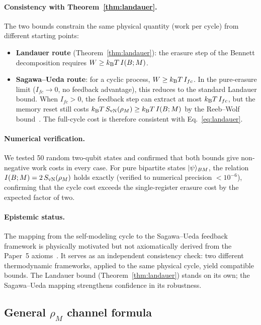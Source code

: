 \paragraph{Consistency with Theorem~\ref{thm:landauer}.}
The two bounds constrain the same physical quantity (work per cycle)
from different starting points:
\begin{itemize}
  \item \textbf{Landauer route}
    (Theorem~\ref{thm:landauer}): the erasure step of the Bennett
    decomposition requires $W \geq k_{\mathrm{B}} T\,I(B;M)$.
  \item \textbf{Sagawa--Ueda route}: for a cyclic process,
    $W \geq k_{\mathrm{B}} T\,I_{fc}$.  In the pure-erasure limit
    ($I_{fc} \to 0$, no feedback advantage), this reduces to the
    standard Landauer bound.  When $I_{fc} > 0$, the feedback
    step can extract at most $k_{\mathrm{B}} T\,I_{fc}$, but the memory reset
    still costs $k_{\mathrm{B}} T\,S_{\mathrm{vN}}(\rho_M) \geq k_{\mathrm{B}} T\,I(B;M)$ by the
    Reeb--Wolf bound~\cite{ReebWolf2014}.  The full-cycle cost
    is therefore consistent with Eq.~\eqref{eq:landauer}.
\end{itemize}

\paragraph{Numerical verification.}
We tested 50 random two-qubit states and confirmed that both bounds
give non-negative work costs in every case.  For pure bipartite states
$| \psi \rangle_{BM}$, the relation $I(B;M) = 2\,S_{\mathrm{vN}}(\rho_M)$ holds
exactly (verified to numerical precision $< 10^{-6}$), confirming that
the cycle cost exceeds the single-register erasure cost by the
expected factor of two.

\paragraph{Epistemic status.}
The mapping from the self-modeling cycle to the Sagawa--Ueda feedback
framework is physically motivated but not axiomatically derived from
the Paper~5 axioms~\cite{Paper5}.  It serves as an independent
consistency check: two different thermodynamic frameworks, applied to
the same physical cycle, yield compatible bounds.  The Landauer bound
(Theorem~\ref{thm:landauer}) stands on its own; the Sagawa--Ueda
mapping strengthens confidence in its robustness.

\subsection{General $\rho_M$ channel
  formula}\label{app:general-channel}

